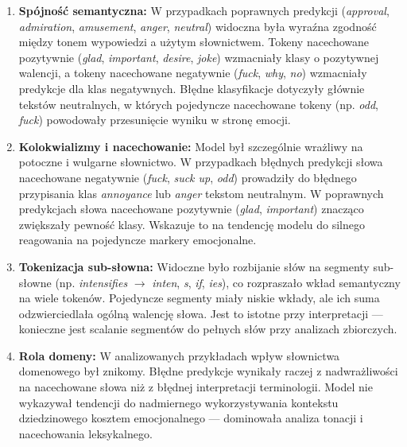 \documentclass[wmii, inf, mgr]{uwmthesis}
\begin{document}
\begin{enumerate}
	\item \textbf{Spójność semantyczna:} 
	W przypadkach poprawnych predykcji (\textit{approval}, \textit{admiration}, \textit{amusement}, \textit{anger}, \textit{neutral}) widoczna była wyraźna zgodność między tonem wypowiedzi a użytym słownictwem. Tokeny nacechowane pozytywnie (\textit{glad}, \textit{important}, \textit{desire}, \textit{joke}) wzmacniały klasy o pozytywnej walencji, a tokeny nacechowane negatywnie (\textit{fuck}, \textit{why}, \textit{no}) wzmacniały predykcje dla klas negatywnych. Błędne klasyfikacje dotyczyły głównie tekstów neutralnych, w których pojedyncze nacechowane tokeny (np. \textit{odd}, \textit{fuck}) powodowały przesunięcie wyniku w stronę emocji.
	
	\item \textbf{Kolokwializmy i nacechowanie:} 
	Model był szczególnie wrażliwy na potoczne i wulgarne słownictwo. W przypadkach błędnych predykcji słowa nacechowane negatywnie (\textit{fuck}, \textit{suck up}, \textit{odd}) prowadziły do błędnego przypisania klas \textit{annoyance} lub \textit{anger} tekstom neutralnym. W poprawnych predykcjach słowa nacechowane pozytywnie (\textit{glad}, \textit{important}) znacząco zwiększały pewność klasy. Wskazuje to na tendencję modelu do silnego reagowania na pojedyncze markery emocjonalne.
	
	\item \textbf{Tokenizacja sub-słowna:} 
	Widoczne było rozbijanie słów na segmenty sub-słowne (np. \textit{intensifies} $\rightarrow$ \textit{inten}, \textit{s}, \textit{if}, \textit{ies}), co rozpraszało wkład semantyczny na wiele tokenów. Pojedyncze segmenty miały niskie wkłady, ale ich suma odzwierciedlała ogólną walencję słowa. Jest to istotne przy interpretacji — konieczne jest scalanie segmentów do pełnych słów przy analizach zbiorczych.
	
	\item \textbf{Rola domeny:} 
	W analizowanych przykładach wpływ słownictwa domenowego był znikomy. Błędne predykcje wynikały raczej z nadwrażliwości na nacechowane słowa niż z błędnej interpretacji terminologii. Model nie wykazywał tendencji do nadmiernego wykorzystywania kontekstu dziedzinowego kosztem emocjonalnego — dominowała analiza tonacji i nacechowania leksykalnego.
\end{enumerate}
\end{document}
